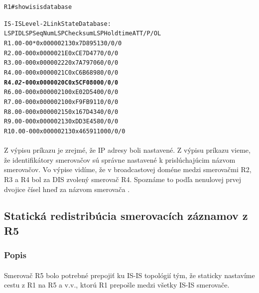 \documentclass[12pt,twoside,a4paper]{report}
\begin{document}
\noindent
{\selectfont
\begin{small}
\begin{alltt}
R1#show isis database

IS-IS Level-2 Link State Database:
LSPID                 LSP Seq Num  LSP Checksum  LSP Holdtime      ATT/P/OL
R1.00-00            * 0x00000213   0x7D89        513               0/0/0
R2.00-00              0x0000021E   0xCE7D        477               0/0/0
R3.00-00              0x00000222   0x7A79        706               0/0/0
R4.00-00              0x0000021C   0xC6B6        898               0/0/0
\textbf{R4.\textit{02}-00              0x0000020C   0x5CF0        800               0/0/0}
R6.00-00              0x00000210   0xE02D        540               0/0/0
R7.00-00              0x00000210   0xF9FB        911               0/0/0
R8.00-00              0x00000215   0x167D        434               0/0/0
R9.00-00              0x00000213   0xDD3E        458               0/0/0
R10.00-00             0x00000213   0x4659        1100              0/0/0
\end{alltt}
\end{small}
}

\paragraph{}
Z výpisu príkazu  je zrejmé, že IP adresy boli nastavené. Z výpisu príkazu  vieme, že identifikátory smerovačov sú správne nastavené k prislúchajúcim názvom smerovačov. Vo výpise  vidíme, že v broadcastovej doméne medzi smerovačmi R2, R3 a R4 bol za DIS zvolený smerovač R4. Spoznáme to podľa nenulovej prvej dvojice čísel hneď za názvom smerovača .



\subsection{Statická redistribúcia smerovacích záznamov z R5}
\subsubsection{Popis}
\paragraph{}
Smerovač R5 bolo potrebné prepojiť ku IS-IS topológií tým, že staticky nastavíme cestu z R1 na R5 a v.v., ktorú R1 prepošle medzi všetky IS-IS smerovače.
\end{document}
